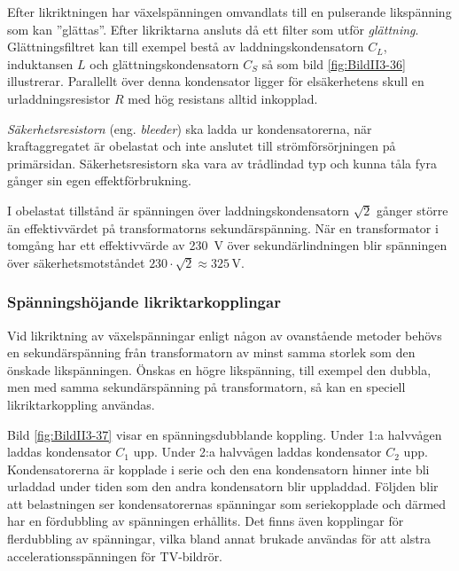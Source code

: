 
Efter likriktningen har växelspänningen omvandlats till en pulserande
likspänning som kan ''glättas''.
Efter likriktarna ansluts då ett filter som utför \emph{glättning}.
Glättningsfiltret kan till exempel bestå av laddningskondensatorn \(C_L\), induktansen \(L\) och glättningskondensatorn \(C_S\) så som bild \ref{fig:BildII3-36}
illustrerar.
Parallellt över denna kondensator ligger för elsäkerhetens skull en
urladdningsresistor \(R\) med hög resistans alltid inkopplad.

\emph{Säkerhetsresistorn} (eng. \emph{bleeder}) ska ladda ur kondensatorerna,
när kraftaggregatet är obelastat och inte anslutet till strömförsörjningen på primärsidan.
Säkerhetsresistorn ska vara av trådlindad typ och kunna tåla fyra gånger sin
egen effektförbrukning.

I obelastat tillstånd är spänningen över laddningskondensatorn \(\sqrt{2}\)
gånger större än effektivvärdet på transformatorns sekundärspänning.
När en transformator i tomgång har ett effektivvärde av \SI{230}{\volt} över
sekundärlindningen blir spänningen över säkerhetsmotståndet
\(230\cdot\sqrt{2} \approx 325\)\,V.

\subsubsection{Spänningshöjande likriktarkopplingar}

Vid likriktning av växelspänningar enligt någon av ovanstående metoder behövs
en sekundärspänning från transformatorn av minst samma storlek som den önskade
likspänningen.
Önskas en högre likspänning, till exempel den dubbla, men med samma sekundärspänning
på transformatorn, så kan en speciell likriktarkoppling användas.


Bild \ref{fig:BildII3-37} visar en spänningsdubblande koppling.
Under 1:a halvvågen laddas kondensator \(C_1\) upp.
Under 2:a halvvågen laddas kondensator \(C_2\) upp.
Kondensatorerna är kopplade i serie och den ena kondensatorn hinner inte bli
urladdad under tiden som den andra kondensatorn blir uppladdad.
Följden blir att belastningen ser kondensatorernas spänningar som seriekopplade
och därmed har en fördubbling av spänningen erhållits.
Det finns även kopplingar för flerdubbling av spänningar, vilka bland annat
brukade användas för att alstra accelerationsspänningen för TV-bildrör.

